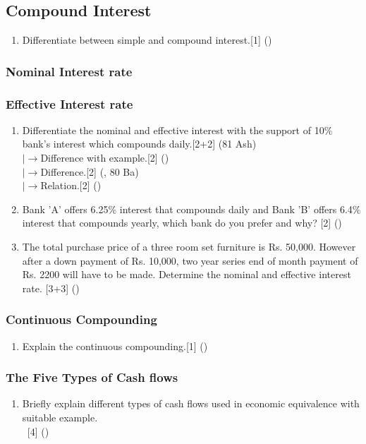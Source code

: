 \documentclass[12pt]{article}
\newcommand{\lb}{\\ $\left|\rightarrow\right.$}
\newcommand{\enter}{\\\textcolor{white}{1}}
\begin{document}
	\subsection{Compound Interest}
	\begin{enumerate}
	\item Differentiate between simple and compound interest.\hfill[1] ()
	\end{enumerate}
	\subsubsection{Nominal Interest rate}
	\subsubsection{Effective Interest rate}
	\begin{enumerate}
	\item Differentiate the nominal and effective interest with the support of 10\% bank's interest which compounds daily.\hfill[2+2] (81 Ash)
	\lb Difference with example.\hfill[2] ()
	\lb Difference.\hfill[2] (, 80 Ba)
	\lb Relation.\hfill[2] ()

	\item Bank 'A' offers 6.25\% interest that compounds daily and Bank 'B' offers 6.4\% interest that compounds yearly, which bank do you prefer and why?\hspace{6.2cm} [2] ()

	\item The total purchase price of a three room set furniture is Rs. 50,000. However after a down payment of Rs. 10,000, two year series end of month payment of Rs. 2200 will have to be made.  Determine the nominal and effective interest rate. \hfill [3+3] ()
	\end{enumerate}
	\subsubsection{Continuous Compounding}
	\begin{enumerate}
	\item Explain the continuous compounding.\hfill[1] ()
	\end{enumerate}
	\subsubsection{The Five Types of Cash flows}
	\begin{enumerate}
	\item Briefly explain different types of cash flows used in economic equivalence with suitable example.
	\enter\hfill[4] ()
	\end{enumerate}
\end{document}
